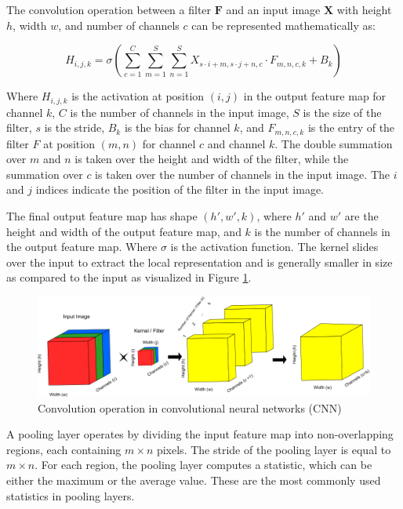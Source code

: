The convolution operation between a filter $\textbf{F}$ and an input image $\textbf{X}$ with height $h$, width $w$, and number of channels $c$ can be represented mathematically as:

\begin{equation}
    \label{eq:Conv1}
    H_{i,j,k} = \sigma\left( \sum_{c=1}^{C} \sum_{m=1}^{S} \sum_{n=1}^{S} X_{s\cdot i + m, s\cdot j + n, c} \cdot F_{m,n,c,k} + B_k \right)
\end{equation}

Where $H_{i,j,k}$ is the activation at position $(i,j)$ in the output feature map for channel $k$, $C$ is the number of channels in the input image, $S$ is the size of the filter, $s$ is the stride, $B_k$ is the bias for channel $k$, and $F_{m,n,c,k}$ is the entry of the filter $F$ at position $(m,n)$ for channel $c$ and channel $k$. The double summation over $m$ and $n$ is taken over the height and width of the filter, while the summation over $c$ is taken over the number of channels in the input image. The $i$ and $j$ indices indicate the position of the filter in the input image.

The final output feature map has shape $(h', w', k)$, where $h'$ and $w'$ are the height and width of the output feature map, and $k$ is the number of channels in the output feature map. Where $\sigma$ is the activation function. The kernel slides over the input to extract the local representation and is generally smaller in size as compared to the input as visualized in Figure \ref{fig:Convolution}.



\begin{figure}[htbp]
   \begin{center}
      \includegraphics[width=1\linewidth]{Chapitre1/figures/Convolution.png}
   \end{center}
   \caption{ Convolution operation in convolutional neural networks (CNN)}
   \label{fig:Convolution}
\end{figure}



A pooling layer operates by dividing the input feature map into non-overlapping regions, each containing $m \times n$ pixels. The stride of the pooling layer is equal to $m \times n$. For each region, the pooling layer computes a statistic, which can be either the maximum or the average value. These are the most commonly used statistics in pooling layers.

